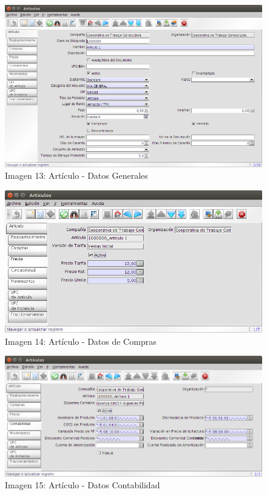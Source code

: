 \documentclass[letterpaper,10pt,spanish]{sphinxmanual}
\begin{document}
\begin{figure}[htbp]
\centering
\capstart

\includegraphics{ly_art_gen.png}
\caption{Imagen 13: Artículo - Datos Generales}\end{figure}
\begin{figure}[htbp]
\centering
\capstart

\includegraphics{ly_art_precio.png}
\caption{Imagen 14: Artículo - Datos de Compras}\end{figure}
\begin{figure}[htbp]
\centering
\capstart

\includegraphics{ly_art_contab.png}
\caption{Imagen 15: Artículo - Datos Contabilidad}\end{figure}
\end{document}
